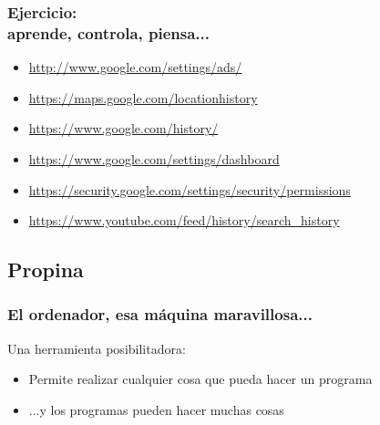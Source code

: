 \documentclass[17pt,aspectratio=169]{beamer}
\renewcommand{\secimage}{figs/bookpages}
\newcommand{\secimage}{figs/bookpages}
\begin{document}



\begin{frame}
\frametitle{Ejercicio: \\ aprende, controla, piensa...}


{\small
\begin{itemize}
  \item \url{http://www.google.com/settings/ads/}
  \item \url{https://maps.google.com/locationhistory}
  \item \url{https://www.google.com/history/}
  \item \url{https://www.google.com/settings/dashboard}
  \item \url{https://security.google.com/settings/security/permissions}
  \item \url{https://www.youtube.com/feed/history/search_history}
  \end{itemize}
}
\end{frame}

\renewcommand{\secimage}{figs/tipjar}
{\bf
  \textcolor[rgb]{1,1,1}{
    \section{Propina}
  }
}


\begin{frame}
\frametitle{El ordenador, esa máquina maravillosa...}

Una herramienta posibilitadora:

\begin{itemize}
\item Permite realizar cualquier cosa que pueda hacer un programa
\item ...y los programas pueden hacer muchas cosas
\end{itemize}


\end{frame}
\end{document}
